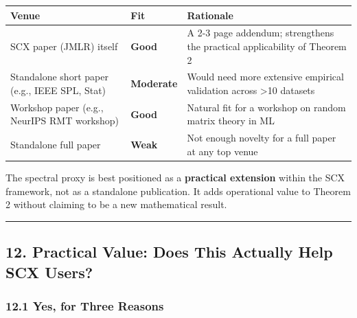 \documentclass[
  12pt,
]{article}
\begin{document}
\begin{longtable}[]{@{}
  >{\raggedright\arraybackslash}p{}
  >{\raggedright\arraybackslash}p{}
  >{\raggedright\arraybackslash}p{}@{}}
\toprule\noalign{}
\begin{minipage}[b]{\linewidth}\raggedright
Venue
\end{minipage} & \begin{minipage}[b]{\linewidth}\raggedright
Fit
\end{minipage} & \begin{minipage}[b]{\linewidth}\raggedright
Rationale
\end{minipage} \\
\midrule\noalign{}
\endhead
\bottomrule\noalign{}
\endlastfoot
SCX paper (JMLR) itself & \textbf{Good} & A 2-3 page addendum;
strengthens the practical applicability of Theorem 2 \\
Standalone short paper (e.g., IEEE SPL, Stat) & \textbf{Moderate} &
Would need more extensive empirical validation across \textgreater10
datasets \\
Workshop paper (e.g., NeurIPS RMT workshop) & \textbf{Good} & Natural
fit for a workshop on random matrix theory in ML \\
Standalone full paper & \textbf{Weak} & Not enough novelty for a full
paper at any top venue \\
\end{longtable}

The spectral proxy is best positioned as a \textbf{practical extension}
within the SCX framework, not as a standalone publication. It adds
operational value to Theorem 2 without claiming to be a new mathematical
result.

\begin{center}\rule{0.5\linewidth}{0.5pt}\end{center}

\subsection{12. Practical Value: Does This Actually Help SCX
Users?}\label{practical-value-does-this-actually-help-scx-users}

\subsubsection{12.1 Yes, for Three Reasons}\label{yes-for-three-reasons}
\end{document}
